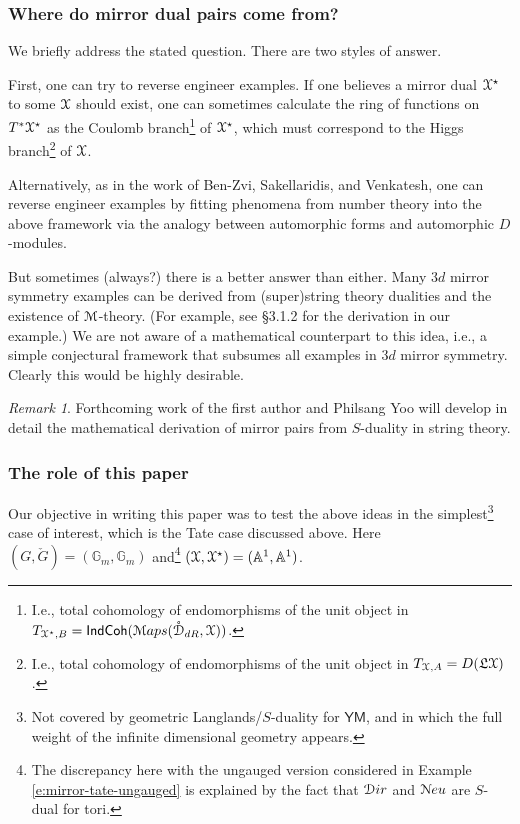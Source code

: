 \documentclass[reqno,11pt]{amsart}
\numberwithin{equation}{subsection}
\theoremstyle{remark}
\newtheorem{rem}[thm]{Remark}
\newcommand{\bA}{{\mathbb A}}
\newcommand{\bG}{{\mathbb G}}
\newcommand{\sD}{{\EuScript D}}
\newcommand{\sM}{{\EuScript M}}
\newcommand{\sN}{{\EuScript N}}
\newcommand{\sX}{{\EuScript X}}
\newcommand{\fL}{{\mathfrak L}}
\newcommand{\IndCoh}{\mathsf{IndCoh}}
\newcommand{\Maps}{\sM aps}
\renewcommand{\o}[1]{\mathring{#1}}
\newcommand{\YM}{\mathsf{YM}}
\newcommand{\Dir}{\sD ir}
\newcommand{\Neu}{\sN eu}
\begin{document}
\subsubsection{Where do mirror dual pairs come from?}

We briefly address the stated question. There are two styles of answer.

First, one can try to reverse engineer examples. If one believes a mirror
dual $\sX^{\star}$ to some $\sX$ should exist, 
one can sometimes calculate the ring of
functions on $T^*{\sX^{\star}}$ as the Coulomb
branch\footnote{I.e., total cohomology of endomorphisms of the unit object
in $T_{\sX^{\star},B} = \IndCoh(\Maps(\o{\sD}_{dR},\sX))$.} of $\sX^{\star}$,
which must correspond to the Higgs branch\footnote{I.e., total cohomology 
of endomorphisms of the unit object
in $T_{\sX,A} = D(\fL \sX)$.} of $\sX$. 

Alternatively, as in the work of Ben-Zvi, Sakellaridis, and Venkatesh,
one can reverse engineer examples by fitting phenomena from number theory
into the above framework via the analogy between automorphic forms
and automorphic $D$-modules.

But sometimes (always?) there is a better answer than either. 
Many $3d$ mirror symmetry examples can be derived from (super)string 
theory dualities and the existence of $\sM$-theory. (For example, see 
\cite{gaiotto-witten} \S 3.1.2 for the derivation in our example.)
We are not aware of a mathematical counterpart to this idea, i.e., a simple conjectural
framework that subsumes all examples in $3d$ mirror symmetry. Clearly this
would be highly desirable. 

\begin{rem}

Forthcoming work of the first author and Philsang Yoo will develop in detail the
mathematical derivation of mirror pairs from $S$-duality in string theory.

\end{rem}

\subsubsection{The role of this paper}

Our objective in writing this paper was to test the above ideas in the
simplest\footnote{Not covered by geometric Langlands/$S$-duality for $\YM$, 
and in which the full weight of the infinite dimensional geometry appears.} 
case of interest, which is the Tate case discussed above. 
Here $(G,\check{G}) = (\bG_m,\bG_m)$ and\footnote{The discrepancy here with the
ungauged version considered in Example \ref{e:mirror-tate-ungauged} is 
explained by the fact that $\Dir$ and $\Neu$ are $S$-dual for tori.} 
$(\sX,\sX^{\star}) = (\bA^1,\bA^1)$. 
\end{document}
